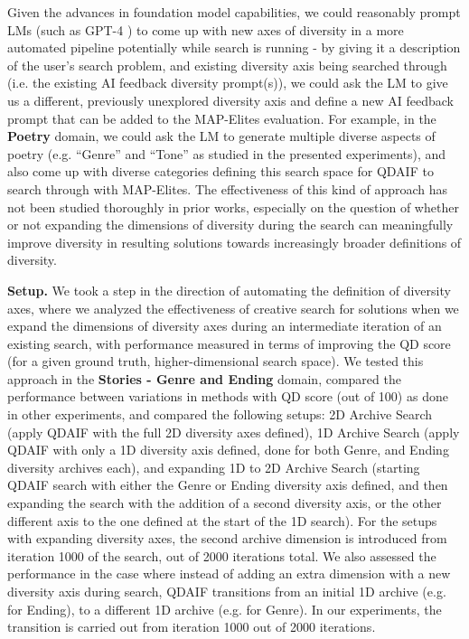 Given the advances in foundation model capabilities, we could reasonably prompt LMs (such as GPT-4 \citep{openai2023gpt4}) to come up with new axes of diversity in a more automated pipeline potentially while search is running - by giving it a description of the user’s search problem, and existing diversity axis being searched through (i.e. the existing AI feedback diversity prompt(s)), we could ask the LM to give us a different, previously unexplored diversity axis and define a new AI feedback prompt that can be added to the MAP-Elites evaluation. For example, in the \textbf{Poetry} domain, we could ask the LM to generate multiple diverse aspects of poetry (e.g. “Genre” and “Tone” as studied in the presented experiments), and also come up with diverse categories defining this search space for QDAIF to search through with MAP-Elites. The effectiveness of this kind of approach has not been studied thoroughly in prior works, especially on the question of whether or not expanding the dimensions of diversity during the search can meaningfully improve diversity in resulting solutions towards increasingly broader definitions of diversity.

\textbf{Setup.} We took a step in the direction of automating the definition of diversity axes, where we analyzed the effectiveness of creative search for solutions when we expand the dimensions of diversity axes during an intermediate iteration of an existing search, with performance measured in terms of improving the QD score (for a given ground truth, higher-dimensional search space). We tested this approach in the \textbf{Stories - Genre and Ending} domain, compared the performance between variations in methods with QD score (out of 100) as done in other experiments, and compared the following setups: 2D Archive Search (apply QDAIF with the full 2D diversity axes defined), 1D Archive Search (apply QDAIF with only a 1D diversity axis defined, done for both Genre, and Ending diversity archives each), and expanding 1D to 2D Archive Search (starting QDAIF search with either the Genre or Ending diversity axis defined, and then expanding the search with the addition of a second diversity axis, or the other different axis to the one defined at the start of the 1D search). For the setups with expanding diversity axes, the second archive dimension is introduced from iteration 1000 of the search, out of 2000 iterations total. We also assessed the performance in the case where instead of adding an extra dimension with a new diversity axis during search, QDAIF transitions from an initial 1D archive (e.g. for Ending), to a different 1D archive (e.g. for Genre). In our experiments, the transition is carried out from iteration 1000 out of 2000 iterations.

